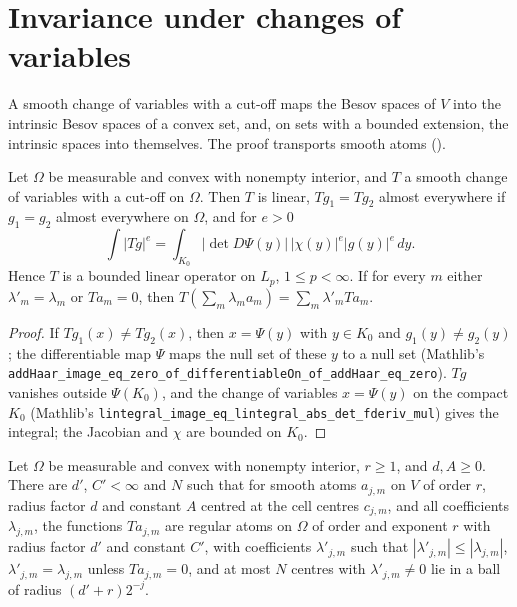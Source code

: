 \section{Invariance under changes of variables}

A smooth change of variables with a cut-off maps the Besov spaces of $V$ into the intrinsic Besov
spaces of a convex set, and, on sets with a bounded extension, the intrinsic spaces into
themselves. The proof transports smooth atoms ().

\begin{lemma}
\label{lem:cutoff-diffeo-lp}
\leanok
{}
Let $\Omega$ be measurable and convex with nonempty interior, and $T$ a smooth change of variables
with a cut-off on $\Omega$. Then $T$ is linear, $T g_1 = T g_2$ almost everywhere if $g_1 = g_2$
almost everywhere on $\Omega$, and for $e > 0$
\[
  \int |T g|^e = \int_{K_0} |\det D\Psi(y)|\, |\chi(y)|^e |g(y)|^e \, dy .
\]
Hence $T$ is a bounded linear operator on $L_p$, $1 \leq p < \infty$. If for every $m$ either
$\lambda'_m = \lambda_m$ or $T a_m = 0$, then $T(\sum_m \lambda_m a_m) = \sum_m \lambda'_m T a_m$.
\end{lemma}

\begin{proof}
\leanok
If $T g_1(x) \neq T g_2(x)$, then $x = \Psi(y)$ with $y \in K_0$ and $g_1(y) \neq g_2(y)$; the
differentiable map $\Psi$ maps the null set of these $y$ to a null set (Mathlib's
\texttt{addHaar\_image\_eq\_zero\_of\_differentiableOn\_of\_addHaar\_eq\_zero}). $T g$ vanishes
outside $\Psi(K_0)$, and the change of variables $x = \Psi(y)$ on the compact $K_0$ (Mathlib's
\texttt{lintegral\_image\_eq\_lintegral\_abs\_det\_fderiv\_mul}) gives the integral; the Jacobian
and $\chi$ are bounded on $K_0$.
\end{proof}

\begin{lemma}
\label{lem:transported-atoms}
\leanok
{}
Let $\Omega$ be measurable and convex with nonempty interior, $r \geq 1$, and $d, A \geq 0$. There
are $d'$, $C' < \infty$ and $N$ such that for smooth atoms $a_{j,m}$ on $V$ of order $r$, radius
factor $d$ and constant $A$ centred at the cell centres $c_{j,m}$, and all coefficients
$\lambda_{j,m}$, the functions $T a_{j,m}$ are regular atoms on $\Omega$ of order and exponent
$r$ with radius factor $d'$ and constant $C'$, with coefficients $\lambda'_{j,m}$ such that
$|\lambda'_{j,m}| \leq |\lambda_{j,m}|$, $\lambda'_{j,m} = \lambda_{j,m}$ unless $T a_{j,m} = 0$,
and at most $N$ centres with $\lambda'_{j,m} \neq 0$ lie in a ball of radius $(d' + r) 2^{-j}$.
\end{lemma}

